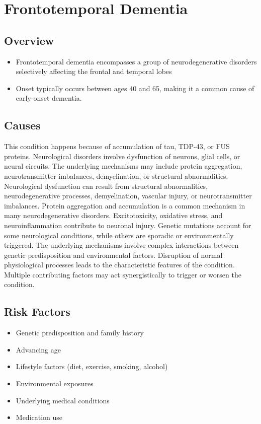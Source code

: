 \chapter{Frontotemporal Dementia}
\label{sec:Frontotemporal Dementia}

\section{Overview}


\begin{itemize}[noitemsep]
  \item Frontotemporal dementia encompasses a group of neurodegenerative disorders selectively affecting the frontal and temporal lobes
  \item Onset typically occurs between ages 40 and 65, making it a common cause of early-onset dementia.
\end{itemize}
\section{Causes}
This condition happens because of accumulation of tau, TDP-43, or FUS proteins. Neurological disorders involve dysfunction of neurons, glial cells, or neural circuits. The underlying mechanisms may include protein aggregation, neurotransmitter imbalances, demyelination, or structural abnormalities. Neurological dysfunction can result from structural abnormalities, neurodegenerative processes, demyelination, vascular injury, or neurotransmitter imbalances. Protein aggregation and accumulation is a common mechanism in many neurodegenerative disorders. Excitotoxicity, oxidative stress, and neuroinflammation contribute to neuronal injury. Genetic mutations account for some neurological conditions, while others are sporadic or environmentally triggered. The underlying mechanisms involve complex interactions between genetic predisposition and environmental factors. Disruption of normal physiological processes leads to the characteristic features of the condition. Multiple contributing factors may act synergistically to trigger or worsen the condition.
\section{Risk Factors}
\begin{itemize}[noitemsep]
  \item Genetic predisposition and family history
  \item Advancing age
  \item Lifestyle factors (diet, exercise, smoking, alcohol)
  \item Environmental exposures
  \item Underlying medical conditions
  \item Medication use
\end{itemize}
